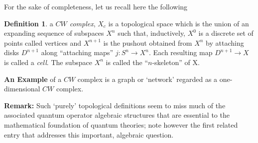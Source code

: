 \documentclass[12pt]{article}
\theoremstyle{plain}
\theoremstyle{definition}
\newtheorem{definition}{Definition}[section]
\numberwithin{equation}{section}
\newcommand{\<}{{\langle}}
\begin{document}
For the sake of completeness, let us recall here the following

\begin{definition} a \emph{$CW$ complex}, $X_c$ is a topological space which is the union of an expanding 
sequence of subspaces $X^n$ such that, inductively, $X^0$ is a discrete set of points called 
vertices and $X^{n+1}$ is the pushout obtained from $X^n$ by attaching disks $D^{n+1}$ along 
``attaching maps'' $j: S^n \rightarrow X^n$. Each resulting map $D^{n+1} \longrightarrow X$  is 
called a \emph{cell}.  The subspace $X^n$ is called the ``$n$-skeleton'' of X. 
\end{definition}

\textbf{An Example} of a $CW$ complex is a graph or `network' regarded as a one-dimensional $CW$ complex.

\textbf{Remark:}
Such `purely' topological definitions seem to miss much of the associated quantum operator algebraic structures
that are essential to the mathematical foundation of quantum theories; note however the first related entry
that addresses this important, algebraic question. 
\end{document}
